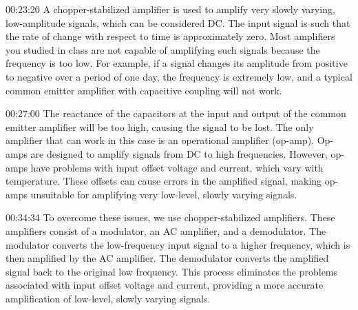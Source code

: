 00:23:20	A chopper-stabilized amplifier is used to amplify very slowly varying, low-amplitude signals, which can be considered DC. The input signal is such that the rate of change with respect to time is approximately zero. Most amplifiers you studied in class are not capable of amplifying such signals because the frequency is too low. For example, if a signal changes its amplitude from positive to negative over a period of one day, the frequency is extremely low, and a typical common emitter amplifier with capacitive coupling will not work.

00:27:00	The reactance of the capacitors at the input and output of the common emitter amplifier will be too high, causing the signal to be lost. The only amplifier that can work in this case is an operational amplifier (op-amp). Op-amps are designed to amplify signals from DC to high frequencies. However, op-amps have problems with input offset voltage and current, which vary with temperature. These offsets can cause errors in the amplified signal, making op-amps unsuitable for amplifying very low-level, slowly varying signals.

00:34:34	To overcome these issues, we use chopper-stabilized amplifiers. These amplifiers consist of a modulator, an AC amplifier, and a demodulator. The modulator converts the low-frequency input signal to a higher frequency, which is then amplified by the AC amplifier. The demodulator converts the amplified signal back to the original low frequency. This process eliminates the problems associated with input offset voltage and current, providing a more accurate amplification of low-level, slowly varying signals.

